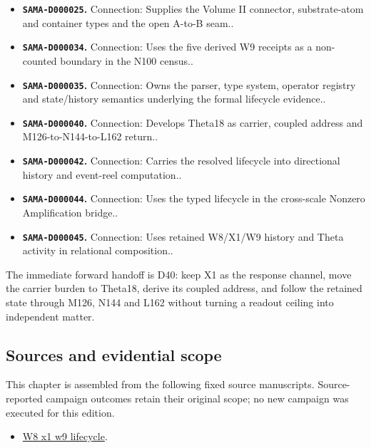 \begin{itemize}
\tightlist
\item
  \textbf{\texttt{SAMA-D000025}.} Connection: Supplies the Volume II
  connector, substrate-atom and container types and the open A-to-B
  seam..
\item
  \textbf{\texttt{SAMA-D000034}.} Connection: Uses the five derived W9
  receipts as a non-counted boundary in the N100 census..
\item
  \textbf{\texttt{SAMA-D000035}.} Connection: Owns the parser, type
  system, operator registry and state/history semantics underlying the
  formal lifecycle evidence..
\item
  \textbf{\texttt{SAMA-D000040}.} Connection: Develops Theta18 as
  carrier, coupled address and M126-to-N144-to-L162 return..
\item
  \textbf{\texttt{SAMA-D000042}.} Connection: Carries the resolved
  lifecycle into directional history and event-reel computation..
\item
  \textbf{\texttt{SAMA-D000044}.} Connection: Uses the typed lifecycle
  in the cross-scale Nonzero Amplification bridge..
\item
  \textbf{\texttt{SAMA-D000045}.} Connection: Uses retained W8/X1/W9
  history and Theta activity in relational composition..
\end{itemize}

The immediate forward handoff is D40: keep X1 as the response channel,
move the carrier burden to Theta18, derive its coupled address, and
follow the retained state through M126, N144 and L162 without turning a
readout ceiling into independent matter.

\subsection{Sources and evidential
scope}\label{viii-ch05-sources-and-evidential-scope}

This chapter is assembled from the following fixed source manuscripts.
Source-reported campaign outcomes retain their original scope; no new
campaign was executed for this edition.

\begin{itemize}
\tightlist
\item
  \href{https://github.com/iwtbotiwtwot/SAMA/blob/4c2b5dc1649da5900c90b90d0ce56c223dbb7717/vol_iii/03-writes-and-history/w8-x1-w9-lifecycle.md}{W8
  x1 w9 lifecycle}.
\end{itemize}

